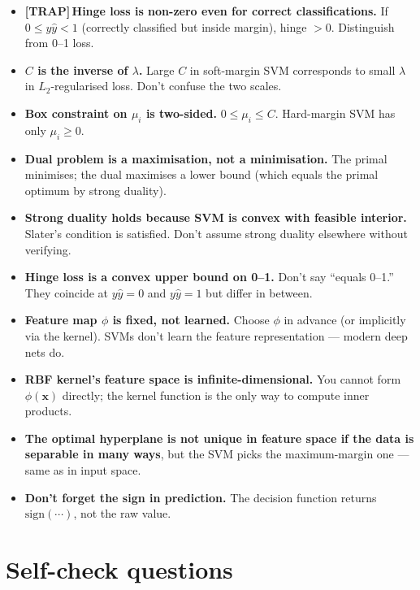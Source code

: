 \documentclass[11pt, a4paper]{article}
\newcommand{\trapflag}{\textcolor{trapBd}{\textbf{[TRAP]}}\,}
\begin{document}
\begin{itemize}
  \item \trapflag{}\textbf{Hinge loss is non-zero even for correct classifications.} If $0 \le y\hat y < 1$ (correctly classified but inside margin), hinge $> 0$. Distinguish from 0--1 loss.
  \item \textbf{$C$ is the inverse of $\lambda$.} Large $C$ in soft-margin SVM corresponds to small $\lambda$ in $L_2$-regularised loss. Don't confuse the two scales.
  \item \textbf{Box constraint on $\mu_i$ is two-sided.} $0 \le \mu_i \le C$. Hard-margin SVM has only $\mu_i \ge 0$.
  \item \textbf{Dual problem is a maximisation, not a minimisation.} The primal minimises; the dual maximises a lower bound (which equals the primal optimum by strong duality).
  \item \textbf{Strong duality holds because SVM is convex with feasible interior.} Slater's condition is satisfied. Don't assume strong duality elsewhere without verifying.
  \item \textbf{Hinge loss is a convex upper bound on 0--1.} Don't say ``equals 0--1.'' They coincide at $y\hat y = 0$ and $y\hat y = 1$ but differ in between.
  \item \textbf{Feature map $\phi$ is fixed, not learned.} Choose $\phi$ in advance (or implicitly via the kernel). SVMs don't learn the feature representation — modern deep nets do.
  \item \textbf{RBF kernel's feature space is infinite-dimensional.} You cannot form $\phi(\mathbf{x})$ directly; the kernel function is the only way to compute inner products.
  \item \textbf{The optimal hyperplane is not unique in feature space if the data is separable in many ways}, but the SVM picks the maximum-margin one — same as in input space.
  \item \textbf{Don't forget the sign in prediction.} The decision function returns $\mathrm{sign}(\cdots)$, not the raw value.
\end{itemize}

\section*{Self-check questions}
\end{document}
